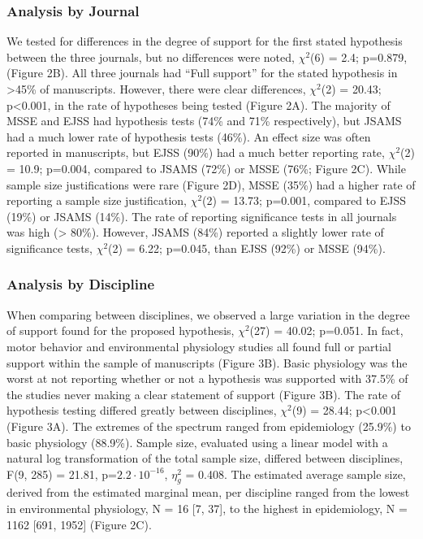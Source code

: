 \documentclass[]{cik}%
\begin{document}
\hypertarget{analysis-by-journal}{%
\subsubsection{Analysis by Journal}\label{analysis-by-journal}}

We tested for differences in the degree of support for the first stated
hypothesis between the three journals, but no differences were noted,
\(\chi^2\)(6) = 2.4; p=0.879, (Figure 2B). All three journals had ``Full
support'' for the stated hypothesis in \textgreater45\% of manuscripts.
However, there were clear differences, \(\chi^2\)(2) = 20.43;
p\textless0.001, in the rate of hypotheses being tested (Figure 2A). The
majority of MSSE and EJSS had hypothesis tests (74\% and 71\%
respectively), but JSAMS had a much lower rate of hypothesis tests
(46\%). An effect size was often reported in manuscripts, but EJSS
(90\%) had a much better reporting rate, \(\chi^2\)(2) = 10.9; p=0.004,
compared to JSAMS (72\%) or MSSE (76\%; Figure 2C). While sample size
justifications were rare (Figure 2D), MSSE (35\%) had a higher rate of
reporting a sample size justification, \(\chi^2\)(2) = 13.73; p=0.001,
compared to EJSS (19\%) or JSAMS (14\%). The rate of reporting
significance tests in all journals was high (\textgreater{} 80\%).
However, JSAMS (84\%) reported a slightly lower rate of significance
tests, \(\chi^2\)(2) = 6.22; p=0.045, than EJSS (92\%) or MSSE (94\%).

\hypertarget{analysis-by-discipline}{%
\subsubsection{Analysis by Discipline}\label{analysis-by-discipline}}

When comparing between disciplines, we observed a large variation in the
degree of support found for the proposed hypothesis, \(\chi^2\)(27) =
40.02; p=0.051. In fact, motor behavior and environmental physiology
studies all found full or partial support within the sample of
manuscripts (Figure 3B). Basic physiology was the worst at not reporting
whether or not a hypothesis was supported with 37.5\% of the studies
never making a clear statement of support (Figure 3B). The rate of
hypothesis testing differed greatly between disciplines, \(\chi^2\)(9) =
28.44; p\textless0.001 (Figure 3A). The extremes of the spectrum ranged
from epidemiology (25.9\%) to basic physiology (88.9\%). Sample size,
evaluated using a linear model with a natural log transformation of the
total sample size, differed between disciplines, F(9, 285) = 21.81,
p=\(2.2 \cdot 10^{-16}\), \(\eta^2_g\) = 0.408. The estimated average
sample size, derived from the estimated marginal mean, per discipline
ranged from the lowest in environmental physiology, N = 16 {[}7, 37{]},
to the highest in epidemiology, N = 1162 {[}691, 1952{]} (Figure 2C).
\end{document}
